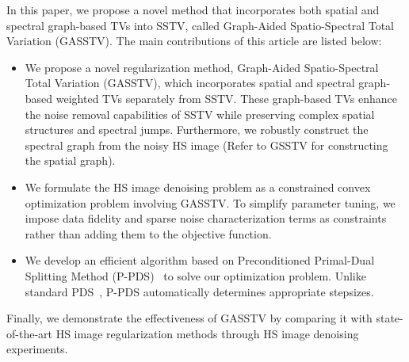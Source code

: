In this paper, we propose a novel method that incorporates both spatial and spectral graph-based TVs into SSTV, called Graph-Aided Spatio-Spectral Total Variation (GASSTV).
The main contributions of this article are listed below:
\begin{itemize}
    \setlength{\leftskip}{-10pt}
    \item We propose a novel regularization method, Graph-Aided Spatio-Spectral Total Variation (GASSTV), which incorporates spatial and spectral graph-based weighted TVs separately from SSTV. These graph-based TVs enhance the noise removal capabilities of SSTV while preserving complex spatial structures and spectral jumps. Furthermore, we robustly construct the spectral graph from the noisy HS image (Refer to GSSTV for constructing the spatial graph).
    \item We formulate the HS image denoising problem as a constrained convex optimization problem involving GASSTV. To simplify parameter tuning, we impose data fidelity and sparse noise characterization terms as constraints rather than adding them to the objective function.
    \item We develop an efficient algorithm based on Preconditioned Primal-Dual Splitting Method (P-PDS)~\cite{Pock2011PPDS, Naganuma2023PPDS} to solve our optimization problem. Unlike standard PDS~\cite{Chambolle2011PDS, Condat2013PDS}, P-PDS automatically determines appropriate stepsizes.
\end{itemize}
Finally, we demonstrate the effectiveness of GASSTV by comparing it with state-of-the-art HS image regularization methods through HS image denoising experiments.